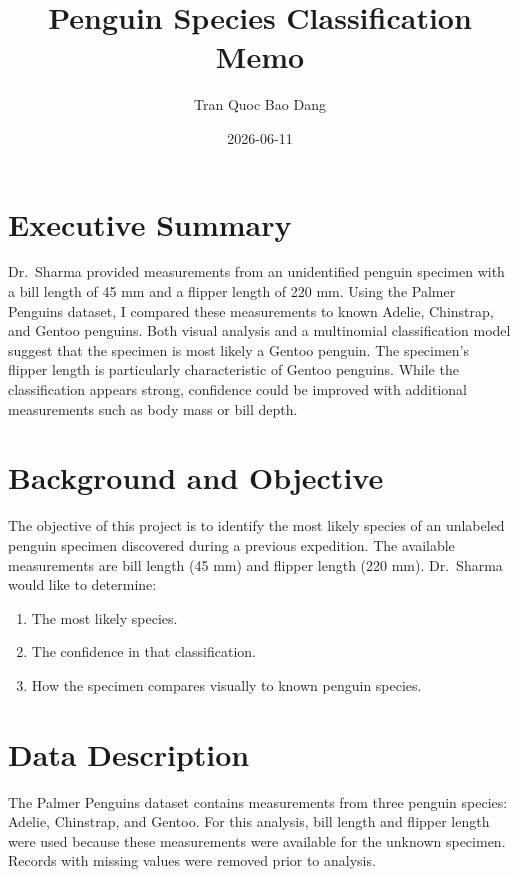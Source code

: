 \documentclass[
]{article}
\title{Penguin Species Classification Memo}
\author{Tran Quoc Bao Dang}
\date{2026-06-11}
\providecommand{\tightlist}{%
  \setlength{\itemsep}{0pt}\setlength{\parskip}{0pt}}
\begin{document}
\maketitle

{
\setcounter{tocdepth}{2}
\tableofcontents
}
\newpage

\section{Executive Summary}\label{executive-summary}

Dr.~Sharma provided measurements from an unidentified penguin specimen
with a bill length of 45 mm and a flipper length of 220 mm. Using the
Palmer Penguins dataset, I compared these measurements to known Adelie,
Chinstrap, and Gentoo penguins. Both visual analysis and a multinomial
classification model suggest that the specimen is most likely a Gentoo
penguin. The specimen's flipper length is particularly characteristic of
Gentoo penguins. While the classification appears strong, confidence
could be improved with additional measurements such as body mass or bill
depth.

\section{Background and Objective}\label{background-and-objective}

The objective of this project is to identify the most likely species of
an unlabeled penguin specimen discovered during a previous expedition.
The available measurements are bill length (45 mm) and flipper length
(220 mm). Dr.~Sharma would like to determine:

\begin{enumerate}
\def\labelenumi{\arabic{enumi}.}
\tightlist
\item
  The most likely species.
\item
  The confidence in that classification.
\item
  How the specimen compares visually to known penguin species.
\end{enumerate}

\section{Data Description}\label{data-description}

The Palmer Penguins dataset contains measurements from three penguin
species: Adelie, Chinstrap, and Gentoo. For this analysis, bill length
and flipper length were used because these measurements were available
for the unknown specimen. Records with missing values were removed prior
to analysis.
\end{document}
